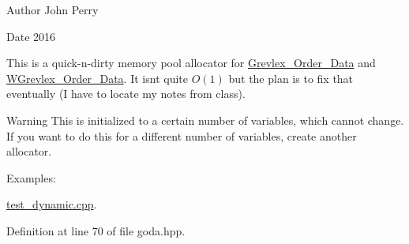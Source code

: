\begin{DoxyAuthor}{Author}
John Perry 
\end{DoxyAuthor}
\begin{DoxyDate}{Date}
2016
\end{DoxyDate}
This is a quick-\/n-\/dirty memory pool allocator for \hyperlink{group__orderinggroup_class_grevlex___order___data}{Grevlex\+\_\+\+Order\+\_\+\+Data} and \hyperlink{group__orderinggroup_class_w_grevlex___order___data}{W\+Grevlex\+\_\+\+Order\+\_\+\+Data}. It isn\textquotesingle{}t quite $O(1)$ but the plan is to fix that eventually (I have to locate my notes from class). \begin{DoxyWarning}{Warning}
This is initialized to a certain number of variables, which cannot change. If you want to do this for a different number of variables, create another allocator. 
\end{DoxyWarning}
\begin{Desc}
\item[Examples\+: ]\par
\hyperlink{test_dynamic_8cpp-example}{test\+\_\+dynamic.\+cpp}.\end{Desc}


Definition at line 70 of file goda.\+hpp.

